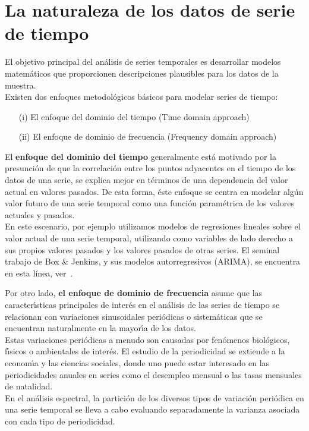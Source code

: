 
\section{La naturaleza de los datos de serie de tiempo}

El objetivo principal del an\'alisis de series temporales es desarrollar modelos matem\'aticos que proporcionen descripciones plausibles para los datos de la muestra.
\\
Existen dos enfoques metodol\'ogicos b\'asicos para modelar series de tiempo:

	\begin{itemize}
		\item[(i)] El enfoque del dominio del tiempo (Time domain approach)
		\item[(ii)] El enfoque de dominio de frecuencia (Frequency domain approach)
	\end{itemize}


El \textbf{enfoque del dominio del tiempo} generalmente est\'a motivado por la presunci\'on de que la correlaci\'on entre los puntos adyacentes en el tiempo de los datos de una serie, se explica mejor en t\'erminos de una dependencia del valor actual en valores pasados. De esta forma, \'este enfoque se centra en modelar alg\'un valor futuro de una serie temporal como una función param\'etrica de los valores actuales y pasados.
\\
En este escenario, por ejemplo utilizamos modelos de regresiones lineales sobre el valor actual de una serie temporal, utilizando como variables de lado derecho a sus propios valores pasados y los valores pasados de otras series. El seminal trabajo de Box \& Jenkins, y sus modelos autorregresivos (ARIMA), se encuentra en esta línea, ver~\cite{BoxJenkins}.
%

Por otro lado, \textbf{el enfoque de dominio de frecuencia} asume que las caracter\'\i{}sticas principales de inter\'es en el an\'alisis de las series de tiempo se relacionan con variaciones sinusoidales peri\'odicas o sistem\'aticas que se encuentran naturalmente en la mayor\'\i{}a de los datos.
\\
Estas variaciones peri\'odicas a menudo son causadas por fen\'omenos biol\'ogicos, f\'\i{}sicos o ambientales de inter\'es. El estudio de la periodicidad se extiende a la econom\'\i{}a y las ciencias sociales, donde uno puede estar interesado en las periodicidades anuales en series como el desempleo mensual o las tasas mensuales de natalidad.
\\
En el an\'alisis espectral, la partici\'on de los diversos tipos de variaci\'on peri\'odica en una serie temporal se lleva a cabo evaluando separadamente la varianza asociada con cada tipo de periodicidad.

